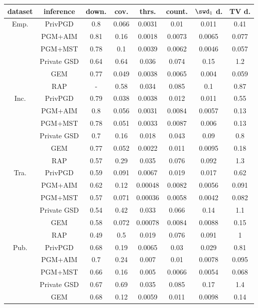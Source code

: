 \begin{table*}[ht]
\centering
\begin{tabular}{cccccccc}
\toprule
dataset & inference & down. & cov. & thrs. & count. & $\swd_1$ d. & TV d. \\
\midrule
\multirow{6}{*}{Emp. } & PrivPGD&0.8 & 0.066 & 0.0031 & 0.01 & 0.011 & 0.41 \\
 & PGM+AIM&0.81 & 0.16 & 0.0018 & 0.0073 & 0.0065 & 0.077 \\
 & PGM+MST&0.78 & 0.1 & 0.0039 & 0.0062 & 0.0046 & 0.057 \\
 & Private GSD&0.64 & 0.64 & 0.036 & 0.074 & 0.15 & 1.2 \\
 & GEM&0.77 & 0.049 & 0.0038 & 0.0065 & 0.004 & 0.059 \\
 & RAP&- & 0.58 & 0.034 & 0.085 & 0.1 & 0.87 \\
\multirow{6}{*}{Inc. } & PrivPGD&0.79 & 0.038 & 0.0038 & 0.012 & 0.011 & 0.55 \\
 & PGM+AIM&0.8 & 0.056 & 0.0031 & 0.0084 & 0.0057 & 0.13 \\
 & PGM+MST&0.78 & 0.051 & 0.0033 & 0.0087 & 0.006 & 0.13 \\
 & Private GSD&0.7 & 0.16 & 0.018 & 0.043 & 0.09 & 0.8 \\
 & GEM&0.77 & 0.052 & 0.0022 & 0.011 & 0.0095 & 0.18 \\
 & RAP&0.57 & 0.29 & 0.035 & 0.076 & 0.092 & 1.3 \\
\multirow{6}{*}{Tra. } & PrivPGD&0.59 & 0.091 & 0.0067 & 0.019 & 0.017 & 0.62 \\
 & PGM+AIM&0.62 & 0.12 & 0.00048 & 0.0082 & 0.0056 & 0.091 \\
 & PGM+MST&0.57 & 0.071 & 0.00036 & 0.0058 & 0.0042 & 0.082 \\
 & Private GSD&0.54 & 0.42 & 0.033 & 0.066 & 0.14 & 1.1 \\
 & GEM&0.58 & 0.072 & 0.00078 & 0.0084 & 0.0088 & 0.15 \\
 & RAP&0.49 & 0.5 & 0.019 & 0.076 & 0.091 & 1 \\
\multirow{6}{*}{Pub. } & PrivPGD&0.68 & 0.19 & 0.0065 & 0.03 & 0.029 & 0.81 \\
 & PGM+AIM&0.7 & 0.24 & 0.007 & 0.01 & 0.0078 & 0.095 \\
 & PGM+MST&0.66 & 0.16 & 0.005 & 0.0066 & 0.0054 & 0.068 \\
 & Private GSD&0.67 & 0.69 & 0.035 & 0.085 & 0.17 & 1.4 \\
 & GEM&0.68 & 0.12 & 0.0059 & 0.011 & 0.0098 & 0.14 \\

\end{tabular}
\end{table*}
